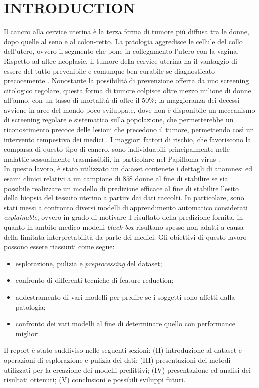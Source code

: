 \section{INTRODUCTION}
Il cancro alla cervice uterina è la terza forma di tumore più diffusa tra le donne, dopo quelle al seno e al colon-retto. La patologia aggredisce le cellule del collo dell’utero, ovvero il segmento che pone in collegamento l’utero con la vagina. Rispetto ad altre neoplasie, il tumore della cervice uterina ha il vantaggio di essere del tutto prevenibile e comunque ben curabile se diagnosticato precocemente \cite{veronesi}.
Nonostante la possibilità di prevenzione offerta da uno screening citologico regolare, questa forma di tumore colpisce oltre mezzo milione di donne all'anno, con un tasso di mortalità di oltre il $50\%$; la maggioranza dei decessi avviene in aree del mondo poco sviluppate, dove non è disponibile un meccanismo di screening regolare e sistematico sulla popolazione, che permetterebbe un riconoscimento precoce delle lesioni che precedono il tumore, permettendo così un intervento tempestivo dei medici \cite{paper}.
I maggiori fattori di rischio, che favoriscono la comparsa di questo tipo di cancro, sono individuabili principalmente nelle malattie sessualmente trasmissibili, in particolare nel Papilloma virus \cite{veronesi}.\\
In questo lavoro, è stato utilizzato un dataset contenete i dettagli di anamnesi ed esami clinici relativi a un campione di $858$ donne al fine di stabilire se sia possibile realizzare un modello di predizione efficace al fine di stabilire l'esito della biopsia del tessuto uterino a partire dai dati raccolti.
In particolare, sono stati messi a confronto diversi modelli di apprendimento automatico considerati \textit{explainable}, ovvero in grado di motivare il risultato della predizione fornita, in quanto in ambito medico modelli \textit{black box} risultano spesso non adatti a causa della limitata interpretabilità da parte dei medici.
Gli obiettivi di questo lavoro possono essere riassunti come segue:
\begin{itemize}
	\item esplorazione, pulizia e \textit{preprocessing} del dataset;
	\item confronto di differenti tecniche di feature reduction;
	\item addestramento di vari modelli per predire se i soggetti sono affetti dalla patologia;
	\item confronto dei vari modelli al fine di determinare quello con performance migliori.
\end{itemize}
Il report è stato suddiviso nelle seguenti sezioni: (II) introduzione al dataset e operazioni di esplorazione e pulizia dei dati; (III) presentazioni dei metodi utilizzati per la creazione dei modelli predittivi; (IV) presentazione ed analisi dei risultati ottenuti; (V) conclusioni e possibili sviluppi futuri.